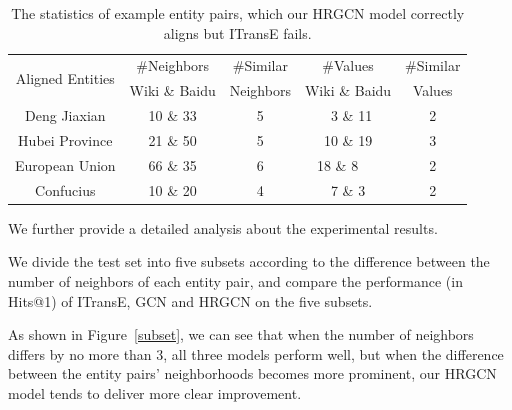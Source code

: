 	\begin{table}
		\centering
		\small
		\begin{tabular}{ccccc}
			\toprule
			\multirow{2}{*}{Aligned Entities} & \#Neighbors & \#Similar & \#Values & \#Similar \\
			& Wiki \& Baidu & Neighbors & Wiki \& Baidu & Values \\
			\midrule
			Deng Jiaxian & 10 \& 33 & 5 & \ 3 \& 11 & 2\\
			Hubei Province & 21 \& 50 & 5 & 10 \& 19 & 3\\
			European Union & 66 \& 35 & 6 & 18 \& 8\ \ \ & 2\\
			Confucius & 10 \& 20 & 4 & 7 \& 3 & 2\\
			\bottomrule
		\end{tabular}
		\caption{The statistics of example entity pairs, which our HRGCN model correctly aligns but ITransE fails.}
		\label{example}
	\end{table} 
	
	We further provide a detailed analysis about the experimental results. 
	
	We divide the test set into five subsets according to the difference between the number of neighbors of each entity pair, and compare the performance (in Hits@1) of ITransE, GCN and HRGCN on the five subsets. 
	
	As shown in Figure~\ref{subset}, we can see that when the number of neighbors differs by no more than 3, all three models perform well,
	but when the difference between the entity pairs' neighborhoods becomes more prominent, 
	our HRGCN model tends to deliver more clear improvement. 


